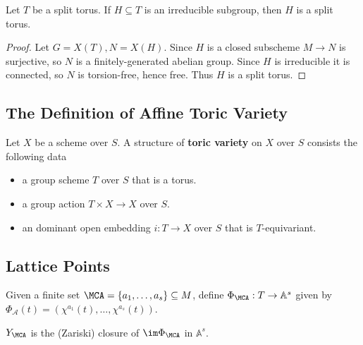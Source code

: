 \begin{proposition}
  \label{1-1-1-subgroup-subtorus}

  Let $T$ be a split torus.
  If $H \subseteq T$ is an irreducible subgroup, then $H$ is a split torus.
\end{proposition}
\begin{proof}

  Let $G = X(T), N=X(H)$. Since $H$ is a closed subscheme $M \to N$ is surjective,
  so $N$ is a finitely-generated abelian group. Since $H$ is irreducible it is connected,
  so $N$ is torsion-free, hence free. Thus $H$ is a split torus.
\end{proof}


\subsection{The Definition of Affine Toric Variety}


\begin{definition}
  \label{1-1-3-tor-var}
  \leanok
  Let $X$ be a scheme over $S$. A structure of {\bf toric variety} on $X$ over $S$ consists the following data
  \begin{itemize}
    \item a group scheme $T$ over $S$ that is a torus.
    \item a group action $T \times X \to X$ over $S$.
    \item an dominant open embedding $i : T \to X$ over $S$ that is $T$-equivariant.
  \end{itemize}
\end{definition}


\subsection{Lattice Points}


\begin{definition}
  \label{1-1-phiA}

  Given a finite set $\MCA = \{a_1, \dotsc, a_s\} \subseteq M$, define $\Phi_\MCA : T \to \mathbb{A}^s$ given by $\Phi_{\mathcal A} (t) = (\chi^{a_1} (t), \dotsc, \chi^{a_s} (t))$.
\end{definition}


\begin{definition}
  \label{1-1-7-ya}

  $Y_\MCA$ is the (Zariski) closure of $\im \Phi_\MCA$ in $\mathbb A^s$.
\end{definition}


